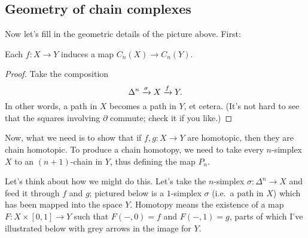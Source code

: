 \subsection{Geometry of chain complexes}
Now let's fill in the geometric details of the picture above.
First:
\begin{lemma}
	Each $f : X \to Y$ induces a map $C_n(X) \to C_n(Y)$.
\end{lemma}
\begin{proof}
	Take the composition
	\[ \Delta^n \xrightarrow{\sigma} X \xrightarrow{f} Y. \]
	In other words, a path in $X$ becomes a path in $Y$, et cetera.
	(It's not hard to see that the squares involving $\partial$ commute;
	check it if you like.)
\end{proof}

Now, what we need is to show that if $f , g : X \to Y$ are homotopic,
then they are chain homotopic.
To produce a chain homotopy, we need to take every $n$-simplex $X$
to an $(n+1)$-chain in $Y$, thus defining the map $P_n$.

Let's think about how we might do this. Let's take the $n$-simplex $\sigma : \Delta^n \to X$
and feed it through $f$ and $g$; pictured below is a $1$-simplex $\sigma$ (i.e.\ a path in $X$)
which has been mapped into the space $Y$.
Homotopy means the existence of a map $F : X \times [0,1] \to Y$
such that $F(-,0) = f$ and $F(-,1) = g$, parts of which I've illustrated below with grey arrows
in the image for $Y$.

